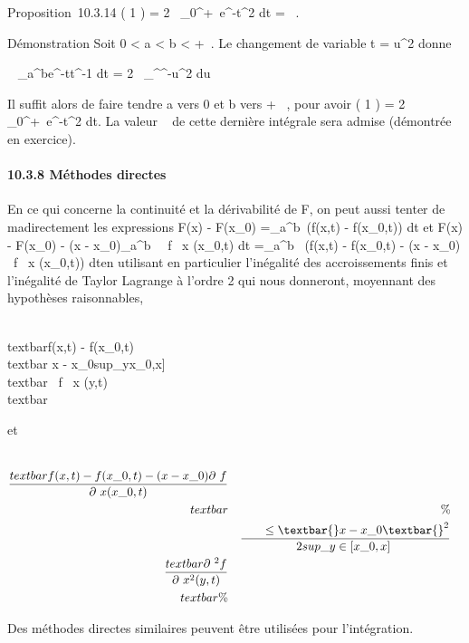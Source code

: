 \documentclass[]{article}
\begin{document}
Proposition~10.3.14 \Gamma( 1  ) =
2\int ~
\_0^+\infty~e^-t^2  dt =
\sqrt\pi~.

Démonstration Soit 0 \textless{} a \textless{} b \textless{} +\infty~. Le
changement de variable t = u^2 donne

\int ~
\_a^be^-tt^-1 dt =
2\int ~
\_\sqrta^\sqrtbe^-u^2
 du

Il suffit alors de faire tendre a vers 0 et b vers + \infty~, pour avoir \Gamma(
1  ) = 2\int ~
\_0^+\infty~e^-t^2  dt. La valeur 
\sqrt\pi~  de cette dernière
intégrale sera admise (démontrée en exercice).

\paragraph{10.3.8 Méthodes directes}

En ce qui concerne la continuité et la dérivabilité de F, on peut aussi
tenter de ma\jmathorer directement les expressions F(x) - F(x\_0)
=\int  \_a^b~(f(x,t) -
f(x\_0,t)) dt et F(x) - F(x\_0) - (x -
x\_0)\int  \_a^b~ \partial~f
\over \partial~x (x\_0,t) dt
=\int  \_a^b~\left
(f(x,t) - f(x\_0,t) - (x - x\_0) \partial~f
\over \partial~x (x\_0,t)\right ) dten
utilisant en particulier l'inégalité des accroissements finis et
l'inégalité de Taylor Lagrange à l'ordre 2 qui nous donneront, moyennant
des hypothèses raisonnables,

\\textbar{}f(x,t) -
f(x\_0,t)\\textbar{} \leq\textbar{}x -
x\_0\textbar{}sup\_y\in{[}x\_0,x{]}~\\textbar{}
\partial~f \over \partial~x (y,t)\\textbar{}

et

\begin{align*} \\textbar{}f(x,t) -
f(x\_0,t) - (x - x\_0) \partial~f \over \partial~x
(x\_0,t)\\textbar{}&& \%&
\\ & & \quad
\quad \leq \textbar{}x -
x\_0\textbar{}^2 \over 2
sup\_y\in{[}x\_0,x{]}~\\textbar{}
\partial~^2f \over \partial~x^2
(y,t)\\textbar{}\%& \\
\end{align*}

Des méthodes directes similaires peuvent être utilisées pour
l'intégration.
\end{document}
